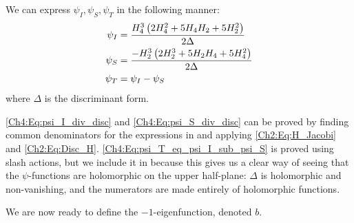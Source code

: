 \begin{boxproposition}\label{Ch4:Prop:psi_as_div_disc}
    We can express $\psi_I, \psi_S, \psi_T$ in the following manner:
    \begin{align}
        \psi_I &= \frac{H_4^3\left( 2 H_4^2 + 5 H_4 H_2 + 5 H_2^2 \right)}{2 \Delta}
            \label{Ch4:Eq:psi_I_div_disc} \\
        \psi_S &= \frac{- H_2^3 \left( 2 H_2^3 + 5 H_2 H_4 + 5 H_4^2 \right)}{2 \Delta}
            \label{Ch4:Eq:psi_S_div_disc} \\
        \psi_T &= \psi_I - \psi_S
            \label{Ch4:Eq:psi_T_eq_psi_I_sub_psi_S}
    \end{align}
    where $\Delta$ is the discriminant form.
\end{boxproposition}

\eqref{Ch4:Eq:psi_I_div_disc} and \eqref{Ch4:Eq:psi_S_div_disc} can be proved by finding common denominators for the expressions in  and applying \eqref{Ch2:Eq:H_Jacobi} and \eqref{Ch2:Eq:Disc_H}. \eqref{Ch4:Eq:psi_T_eq_psi_I_sub_psi_S} is proved using slash actions, but we include it in  because this gives us a clear way of seeing that the $\psi$-functions are holomorphic on the upper half-plane: $\Delta$ is holomorphic and non-vanishing, and the numerators are made entirely of holomorphic functions.

We are now ready to define the $-1$-eigenfunction, denoted $b$.

